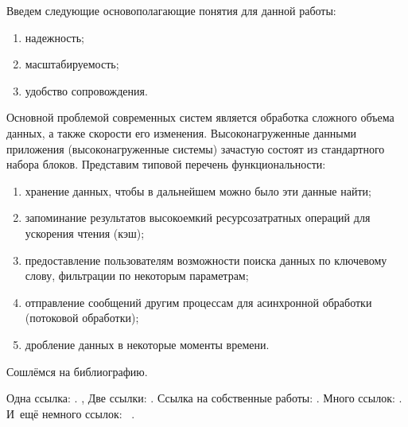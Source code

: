 Введем следующие основополагающие понятия для данной работы:
\begin{enumerate}
	\item надежность;
	\item масштабируемость;
	\item удобство сопровождения.
\end{enumerate}


Основной проблемой современных систем является обработка сложного объема данных, а также скорости его изменения. Высоконагруженные данными приложения (высоконагруженные системы) зачастую состоят из стандартного набора блоков. Представим типовой перечень функциональности:
\begin{enumerate}
	\item хранение данных, чтобы в дальнейшем можно было эти данные найти;
	\item запоминание результатов высокоемкий ресурсозатратных операций для ускорения чтения (кэш);
	\item предоставление пользователям возможности поиска данных по ключевому слову, фильтрации по некоторым параметрам;
	\item отправление сообщений другим процессам для асинхронной обработки (потоковой обработки);
	\item дробление данных в некоторые моменты времени.
\end{enumerate}





Сошлёмся на библиографию.




Одна ссылка: \cite[с.~54]{Sokolov}\cite[с.~36]{Gaidaenko}.
\cite{Sokolov}, \cite{Gaidaenko}
Две ссылки: \cite{Sokolov,Gaidaenko}.
Ссылка на собственные работы: \cite{vakbib1, confbib2}.
Много ссылок: %
\cite{Lermontov, Management, Borozda, Marketing, Constitution, FamilyCode,
    Gost.7.0.53, Razumovski, Lagkueva, Pokrovski, Methodology, Berestova,
    Kriger}%
%
.
И~ещё немного ссылок:~\cite{Article,Book,Booklet,Conference,Inbook,Incollection,Manual,Mastersthesis,
    Misc,Phdthesis,Proceedings,Techreport,Unpublished}
\cite{CEAT:CEAT581, doi:10.1080/01932691.2010.513279,
    Gosele1999161,Li2007StressAnalysis, Shoji199895, test:eisner-sample,
    test:eisner-sample-shorted, AB_patent_Pomerantz_1968, iofis_patent1960}%
%
.

